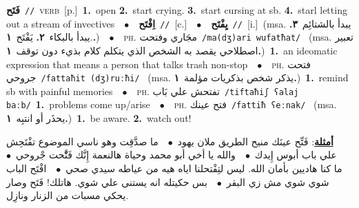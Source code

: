 \documentclass[10pt,a4paper,twoside]{article} %
\begin{document}
\begin{multicols}{2}
{\setlength\topsep{0pt}\textbf{\foreignlanguage{arabic}{فَتَح}}\ {\color{gray}\texttt{//}\color{black}}\ \textsc{verb}\ [p.]\ \textbf{1.}~open  \textbf{2.}~start crying.  \textbf{3.}~start cursing at sb.  \textbf{4.}~starl letting out a stream of invectives\ \ $\bullet$\ \ \setlength\topsep{0pt}\textbf{\foreignlanguage{arabic}{اِفْتَح}}\ {\color{gray}\texttt{//}\color{black}}\ [c.]\ \ $\bullet$\ \ \setlength\topsep{0pt}\textbf{\foreignlanguage{arabic}{يِفْتَح}}\ {\color{gray}\texttt{//}\color{black}}\ [i.]\ \color{gray}(msa. \foreignlanguage{arabic}{يبدأ بالشتائِم}~\foreignlanguage{arabic}{\textbf{٣.}}  .\foreignlanguage{arabic}{يبدأ بالبكاء}~\foreignlanguage{arabic}{\textbf{٢.}}  \foreignlanguage{arabic}{يَفْتَح}~\foreignlanguage{arabic}{\textbf{١.}})\color{black}\ \ $\bullet$\ \ \textsc{ph.} \color{gray} \foreignlanguage{arabic}{مجَاري وفتحت}\color{black}\ {\color{gray}\texttt{/{\sffamily ma(dʒ)ari wufatħat}/}\color{black}}\ \color{gray} (msa. \foreignlanguage{arabic}{تعبير اصطلاحي يقصد به الشخص الذي يتكلم كلام بذيء دون توقف}~\foreignlanguage{arabic}{\textbf{١.}})\color{black}\ \textbf{1.}~an ideomatic expression that means  a person that talks trash non-stop\ \ $\bullet$\ \ \textsc{ph.} \color{gray} \foreignlanguage{arabic}{فتحت جروحي}\color{black}\ {\color{gray}\texttt{/{\sffamily fattaħit (dʒ)ruːħi}/}\color{black}}\ \color{gray} (msa. \foreignlanguage{arabic}{يذكر شخص بذكريات مؤلمة}~\foreignlanguage{arabic}{\textbf{١.}})\color{black}\ \textbf{1.}~remind sb with painful memories\ \ $\bullet$\ \ \textsc{ph.} \color{gray} \foreignlanguage{arabic}{تفتحش علي بَاب}\color{black}\ {\color{gray}\texttt{/{\sffamily tiftaħiʃ ʕalaj baːb}/}\color{black}}\ \textbf{1.}~problems come up/arise\ \ $\bullet$\ \ \textsc{ph.} \color{gray} \foreignlanguage{arabic}{فتح عينك}\color{black}\ {\color{gray}\texttt{/{\sffamily fattiħ ʕeːnak}/}\color{black}}\ \color{gray} (msa. \foreignlanguage{arabic}{يحذَر أو انتبِه}~\foreignlanguage{arabic}{\textbf{١.}})\color{black}\ \textbf{1.}~be aware.  \textbf{2.}~watch out!\  \begin{flushright}\color{gray}\foreignlanguage{arabic}{\textbf{\underline{\foreignlanguage{arabic}{أمثلة}}}: فَتِّح عينَك منيح الطريق ملان يهود\ $\bullet$\ \  ما صدَّقِت وهو ناسي الموضوع تفْتَحِش علي باب أبوس إِيدك\ $\bullet$\ \  والله يا أخي أبو محمد وحياة هالنعمة إِنَّك فَتَّْحت جْروحي\ $\bullet$\ \  ما كنا هاديين بأمان الله. ليس لتِفْتحلنا اياه هيه من عياطه سيدي صحي\ $\bullet$\ \  افْتَح الباب شوي شوي مش زي البقر\ $\bullet$\ \  بس حكيتله انه يستنى علي شوي. هاتلك! فَتَح وصار يحكي مسبات من الزنار ونازِل.}\end{flushright}\color{black}} \vspace{2mm}


\end{multicols}
\end{document}
